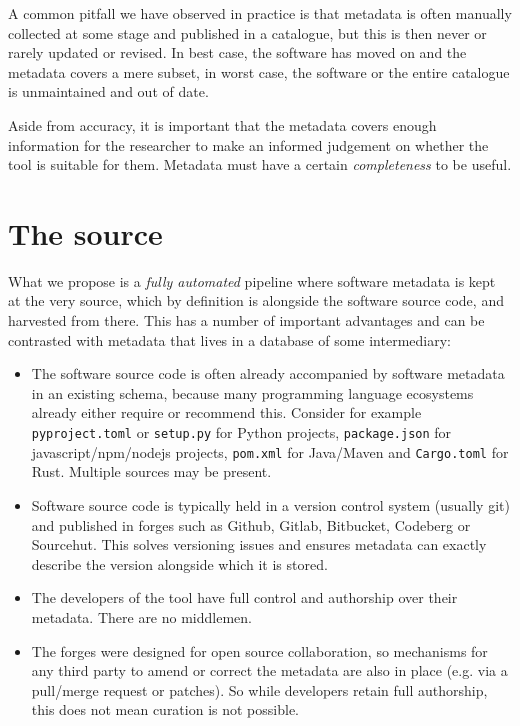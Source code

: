 \documentclass[a4paper,11pt]{article}
\begin{document}
A common pitfall we have observed in practice is that metadata is often
manually collected at some stage and published in a catalogue, but this is then
never or rarely updated or revised. In best case, the software has moved on and the
metadata covers a mere subset, in worst case, the software or the entire
catalogue is unmaintained and out of date.

Aside from accuracy, it is important that the metadata covers enough
information for the researcher to make an informed judgement on whether the
tool is suitable for them. Metadata must have a certain \emph{completeness} to
be useful.

\section{The source}

What we propose is a \emph{fully automated} pipeline where software metadata is kept
at the very source, which by definition is alongside the software source code, and
harvested from there. This has a number of important advantages and can be contrasted
with metadata that lives in a database of some intermediary:

\begin{itemize}
\item The software source code is often already accompanied by software metadata in an existing schema,
  because many programming language ecosystems already either require or recommend this.
  Consider for example \texttt{pyproject.toml} or \texttt{setup.py} for Python projects, \texttt{package.json} for javascript/npm/nodejs projects,
  \texttt{pom.xml} for Java/Maven and \texttt{Cargo.toml} for Rust. Multiple sources may be present.
\item Software source code is typically held in a version control system (usually git) and published in 
  forges such as Github, Gitlab, Bitbucket, Codeberg or Sourcehut. This solves versioning
  issues and ensures metadata can exactly describe the version alongside which it is stored.
\item The developers of the tool have full control and authorship over their metadata. There are no middlemen.
\item The forges were designed for open source collaboration, so mechanisms for any
  third party to amend or correct the metadata are also in place (e.g. via a pull/merge request or patches).
  So while developers retain full authorship, this does not mean curation is not possible.
\end{itemize}
\end{document}
